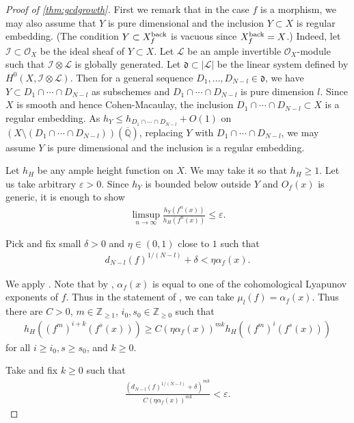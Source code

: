 \documentclass[12pt]{amsart}
\theoremstyle{plain}
\theoremstyle{definition}
\numberwithin{equation}{section}
\def\Z{{\mathbb Z}}
\def\QQ{\overline{\mathbb Q}}
\def\dd{{ \mathfrak{d}}}
\def\O{{ \mathcal{O}}}
\def\I{{ \mathcal{I}}}
\def\L{{ \mathcal{L}}}
\renewcommand{\d}{\delta}
\newcommand{\e}{\varepsilon}
\begin{document}
\begin{proof}[Proof of \cref{thm:gcdgrowth}]
First we remark that in the case $f$ is a morphism,
we may also assume that $Y$ is pure dimensional and the inclusion $Y \subset X$
is regular embedding. (The condition $Y \subset X_{f}^{\rm back}$ is vacuous since $X_{f}^{\rm back} = X$.)
Indeed, let $\I \subset \O_{X}$ be the ideal sheaf of $Y \subset X$.
Let $\L$ be an ample invertible $\O_{X}$-module such that
$\I \otimes \L$ is globally generated.
Let $\dd \subset |\L|$ be the linear system defined by $H^{0}(X, \I \otimes \L)$.
Then for a general sequence $D_{1},\dots , D_{N-l} \in \dd$, 
we have $Y \subset D_{1} \cap \cdots \cap D_{N-l}$ as subschemes
and $ D_{1} \cap \cdots \cap D_{N-l}$ is pure dimension $l$.
Since $X$ is smooth and hence Cohen-Macaulay, the inclusion $ D_{1} \cap \cdots \cap D_{N-l} \subset X$
is a regular embedding.
As $h_{Y} \leq h_{ D_{1} \cap \cdots \cap D_{N-l}} + O(1)$ on $(X \setminus ( D_{1} \cap \cdots \cap D_{N-l}))(\QQ)$,
replacing $Y$ with $ D_{1} \cap \cdots \cap D_{N-l}$, we may assume $Y$ is pure dimensional and
the inclusion is a regular embedding.

Let $h_{H}$ be any ample height function on $X$.
We may take it so that $h_{H} \geq 1$.
Let us take arbitrary $\e > 0$.
Since $h_{Y}$ is bounded below outside $Y$ and $O_{f}(x)$ is generic,
it is enough to show 
\begin{align}
\limsup_{n \to \infty} \frac{h_{Y}(f^{n}(x))}{h_{H}(f^{n}(x))}  \leq \e.
\end{align}

Pick and fix small $\d > 0$ and $\eta \in (0,1)$ close to $1$ such that
\begin{align}
d_{N-l}(f)^{1/(N-l)} + \d < \eta \alpha_{f}(x).
\end{align}

We apply \cite[Lemma 2.4]{matsuzawa-note-ad-dls}.
Note that by \cite[Theorem 2.2]{matsuzawa-note-ad-dls},
$ \alpha_{f}(x)$ is equal to one of the cohomological Lyapunov exponents of $f$.
Thus in the statement of \cite[Lemma 2.4]{matsuzawa-note-ad-dls}, we can take 
$\mu_{l}(f) = \alpha_{f}(x)$.
Thus there are $C > 0$, $m \in \Z_{\geq 1}$, $i_{0}, s_{0} \in \Z_{\geq 0}$ such that 
\begin{align}
h_{H}((f^{m})^{i+k}(f^{s}(x))) \geq C(\eta \alpha_{f}(x))^{mk} h_{H}((f^{m})^{i}(f^{s}(x))) \label{eq:htgrowthlowerbound}
\end{align}
for all $i \geq i_{0}, s \geq s_{0}$, and $k \geq 0$.

Take and fix $k \geq 0$ such that 
\begin{align}
\frac{ (d_{N-l}(f)^{1/(N-l)} + \d )^{mk} }{C (\eta \alpha_{f}(x))^{mk} } < \e.
\end{align}


\end{proof}
\end{document}
